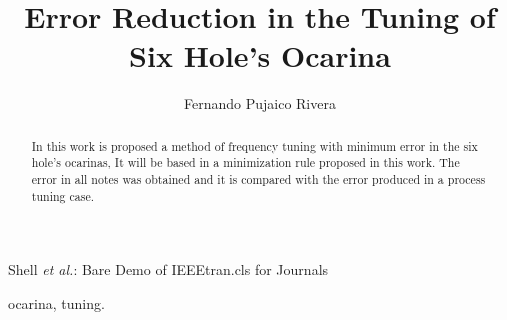 \documentclass[journal]{IEEEtran}
\begin{document}
%
\title{ Error Reduction in the Tuning of Six Hole's Ocarina }
%
%

\author{Fernando Pujaico Rivera%
}



%
{Shell \MakeLowercase{\textit{et al.}}: Bare Demo of IEEEtran.cls for Journals}
% 



\maketitle


\begin{abstract}
In this work is proposed a method of frequency tuning with minimum error in the six hole's ocarinas,
It will be based in a minimization rule proposed in this work.
The error in all notes was obtained and it is compared with the error produced 
in a process tuning case.
\end{abstract}

\begin{IEEEkeywords}
ocarina, tuning.
\end{IEEEkeywords}






%
\IEEEpeerreviewmaketitle
\end{document}
